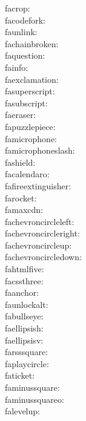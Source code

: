 facrop: {\FA \facrop} \\
facodefork: {\FA \facodefork} \\
faunlink: {\FA \faunlink} \\
fachainbroken: {\FA \fachainbroken} \\
faquestion: {\FA \faquestion} \\
fainfo: {\FA \fainfo} \\
faexclamation: {\FA \faexclamation} \\
fasuperscript: {\FA \fasuperscript} \\
fasubscript: {\FA \fasubscript} \\
faeraser: {\FA \faeraser} \\
fapuzzlepiece: {\FA \fapuzzlepiece} \\
famicrophone: {\FA \famicrophone} \\
famicrophoneslash: {\FA \famicrophoneslash} \\
fashield: {\FA \fashield} \\
facalendaro: {\FA \facalendaro} \\
fafireextinguisher: {\FA \fafireextinguisher} \\
farocket: {\FA \farocket} \\
famaxcdn: {\FA \famaxcdn} \\
fachevroncircleleft: {\FA \fachevroncircleleft} \\
fachevroncircleright: {\FA \fachevroncircleright} \\
fachevroncircleup: {\FA \fachevroncircleup} \\
fachevroncircledown: {\FA \fachevroncircledown} \\
fahtmlfive: {\FA \fahtmlfive} \\
facssthree: {\FA \facssthree} \\
faanchor: {\FA \faanchor} \\
faunlockalt: {\FA \faunlockalt} \\
fabullseye: {\FA \fabullseye} \\
faellipsish: {\FA \faellipsish} \\
faellipsisv: {\FA \faellipsisv} \\
farsssquare: {\FA \farsssquare} \\
faplaycircle: {\FA \faplaycircle} \\
faticket: {\FA \faticket} \\
faminussquare: {\FA \faminussquare} \\
faminussquareo: {\FA \faminussquareo} \\
falevelup: {\FA \falevelup} \\
